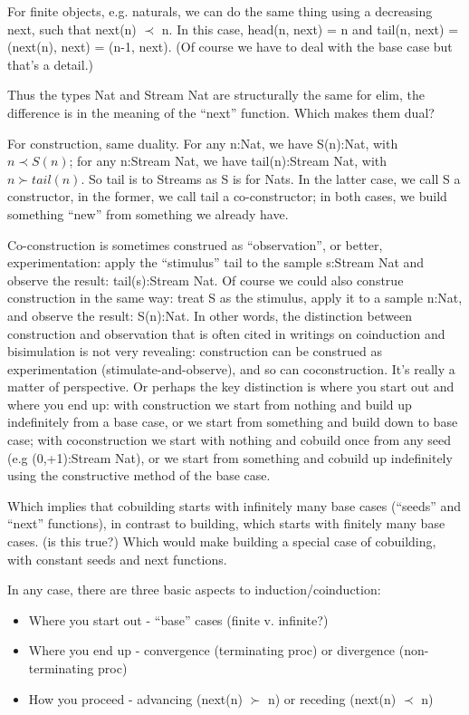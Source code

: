 \documentclass{article}
\begin{document}
For finite objects, e.g. naturals, we can do the same thing using a
decreasing next, such that next(n) \(\prec\) n.  In this case, head(n,
next) = n and tail(n, next) = (next(n), next) = (n-1, next).  (Of
course we have to deal with the base case but that's a detail.)

Thus the types Nat and Stream Nat are structurally the same for elim,
the difference is in the meaning of the ``next'' function.  Which
makes them dual?

For construction, same duality.  For any n:Nat, we have S(n):Nat, with
\(n\prec S(n)\); for any n:Stream Nat, we have tail(n):Stream Nat,
with \(n\succ tail(n)\).  So tail is to Streams as S is for Nats.  In
the latter case, we call S a constructor, in the former, we call tail
a co-constructor; in both cases, we build something ``new'' from
something we already have.

Co-construction is sometimes construed as ``observation'', or better,
experimentation: apply the ``stimulus'' tail to the sample s:Stream
Nat and observe the result: tail(s):Stream Nat.  Of course we could
also construe construction in the same way: treat S as the stimulus,
apply it to a sample n:Nat, and observe the result: S(n):Nat.  In
other words, the distinction between construction and observation that
is often cited in writings on coinduction and bisimulation is not very
revealing: construction can be construed as experimentation
(stimulate-and-observe), and so can coconstruction.  It's really a
matter of perspective.  Or perhaps the key distinction is where you
start out and where you end up: with construction we start from
nothing and build up indefinitely from a base case, or we start from
something and build down to base case; with coconstruction we start
with nothing and cobuild once from any seed (e.g (0,+1):Stream Nat),
or we start from something and cobuild up indefinitely using the
constructive method of the base case.

Which implies that cobuilding starts with infinitely many base cases
(``seeds'' and ``next'' functions), in contrast to building, which
starts with finitely many base cases. (is this true?)  Which would
make building a special case of cobuilding, with constant seeds and
next functions.

In any case, there are three basic aspects to induction/coinduction:

\begin{itemize}
\item Where you start out - ``base'' cases (finite v. infinite?)
\item Where you end up - convergence (terminating proc) or divergence
  (non-terminating proc)
\item How you proceed - advancing (next(n) \(\succ\) n) or receding
  (next(n) \(\prec\) n)
\end{itemize}
\end{document}
